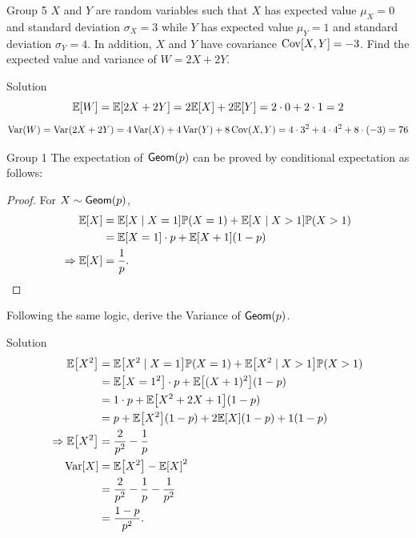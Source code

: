 \documentclass{article}
\begin{document}
\begin{problem}
    {Group 5}
    $X$ and $Y$ are random variables such that $X$ has expected value $\mu_X = 0$ and standard deviation $\sigma_X = 3$ while $Y$ has expected value $\mu_Y = 1$ and standard deviation $\sigma_Y = 4$. In addition, $X$ and $Y$ have covariance $\mathop{\mathrm{Cov}}\nolimits[X, Y] = -3$. Find the expected value and variance of $W = 2X+2Y$.
\end{problem}

\begin{solution}
    {Solution}
    \[
        \E{W} = \E{2X+2Y} = 2\E{X}+2\E{Y} = 2\cdot 0+2\cdot 1 = 2
    \]
    \[
        \mathop{\mathrm{Var}}\nolimits(W) = \mathop{\mathrm{Var}}\nolimits(2X+2Y) = 4\mathop{\mathrm{Var}}\nolimits(X)+4\mathop{\mathrm{Var}}\nolimits(Y)+8\mathop{\mathrm{Cov}}\nolimits(X,Y) = 4\cdot 3^2+4\cdot 4^2+8\cdot (-3) = 76
    \]
\end{solution}
\fi
\iffalse
\begin{problem}
    {Group 1}
    The expectation of $\mathsf{Geom}(p)$ can be proved by conditional expectation as follows:
    \begin{proof}
        For $X\sim\mathsf{Geom}(p)$,
        \begin{align*}
            \E{X}
            &= \condE{X}{X=1}\P{X=1}+\condE{X}{X>1}\P{X>1}\\
            &= \E{X=1}\cdot p + \E{X+1}(1-p)\\
            \Rightarrow
            \E{X} &= \frac{1}{p}.
        \end{align*}
    \end{proof}
    Following the same logic, derive the Variance of $\mathsf{Geom}(p)$.
\end{problem}

\begin{solution}
    {Solution}
    \begin{align*}
        \E{X^2}
        &= \condE{X^2}{X=1}\P{X=1}+\condE{X^2}{X>1}\P{X>1}\\
        &= \E{X=1^2}\cdot p + \E{(X+1)^2}(1-p)\\
        &= 1\cdot p + \E{X^2+2X+1}(1-p)\\
        &= p + \E{X^2}(1-p)+2\E{X}(1-p)+1(1-p)\\
        \Rightarrow
        \E{X^2}
        &= \frac{2}{p^2}-\frac{1}{p}\\
        \Var[X]
        &= \E{X^2}-\E{X}^2 \\
        &= \frac{2}{p^2}-\frac{1}{p}-\frac{1}{p^2} \\
        &= \frac{1-p}{p^2}.
    \end{align*}
\end{solution}
\end{document}
